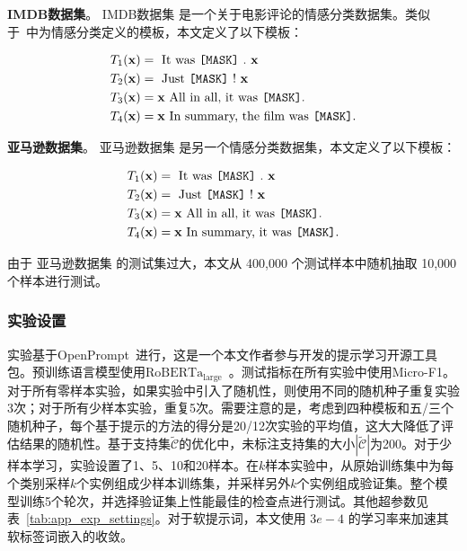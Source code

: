 \textbf{IMDB数据集}。 IMDB数据集 是一个关于电影评论的情感分类数据集。类似于~\cite{schick2020exploiting}中为情感分类定义的模板，本文定义了以下模板：

{\centering
\begin{mybox3}
\begin{align*}
       T_1(\mathbf{x}) & = \text{ It was \texttt{[MASK]} . } \mathbf{x}\\
    T_2(\mathbf{x}) &  = \text{ Just \texttt{[MASK]} ! } \mathbf{x}\\
      T_3(\mathbf{x}) & = \mathbf{x} \text{ All in all, it was } \texttt{[MASK]} . \\
      T_4(\mathbf{x}) & = \mathbf{x} \text{ In summary, the film was } \texttt{[MASK]}.  
\end{align*}
\end{mybox3}
}

\textbf{亚马逊数据集}。 亚马逊数据集 是另一个情感分类数据集，本文定义了以下模板：

{\centering
\begin{mybox}
\begin{align*}
       T_1(\mathbf{x}) & = \text{ It was \texttt{[MASK]} } .\  \mathbf{x}\\
    T_2(\mathbf{x}) &  = \text{ Just \texttt{[MASK]} ! } \mathbf{x}\\
      T_3(\mathbf{x}) & = \mathbf{x} \text{ All in all, it was  \texttt{[MASK]}} . \\
      T_4(\mathbf{x}) & = \mathbf{x} \text{ In summary, it was  \texttt{[MASK]}} .  
\end{align*}
\end{mybox}
}

由于 亚马逊数据集 的测试集过大，本文从 400,000 个测试样本中随机抽取 10,000 个样本进行测试。



\subsubsection{实验设置}
实验基于OpenPrompt~\cite{ding2021openprompt}进行，这是一个本文作者参与开发的提示学习开源工具包。预训练语言模型使用$\text{RoBERTa}_\text{large}$~\cite{liu2019roberta}。测试指标在所有实验中使用Micro-F1。对于所有零样本实验，如果实验中引入了随机性，则使用不同的随机种子重复实验3次；对于所有少样本实验，重复5次。需要注意的是，考虑到四种模板和五/三个随机种子，每个基于提示的方法的得分是20/12次实验的平均值，这大大降低了评估结果的随机性。基于支持集$\tilde{\mathcal{C}}$的优化中，未标注支持集的大小$|\tilde{\mathcal{C}}|$为200。对于少样本学习，实验设置了1、5、10和20样本。在$k$样本实验中，从原始训练集中为每个类别采样$k$个实例组成少样本训练集，并采样另外$k$个实例组成验证集。整个模型训练5个轮次，并选择验证集上性能最佳的检查点进行测试。其他超参数见表~\ref{tab:app_exp_settings}。对于软提示词，本文使用 $3e-4$ 的学习率来加速其软标签词嵌入的收敛。

